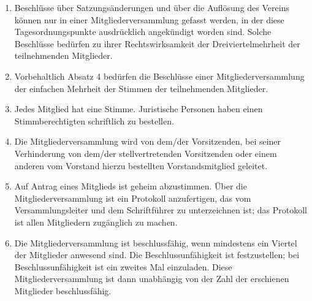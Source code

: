 \documentclass[a4paper]{article}
\begin{document}
\begin{enumerate}
	\item Beschlüsse über Satzungsänderungen und über die Auflösung des Vereins können nur in einer Mitgliederversammlung gefasst werden, in der diese Tagesordnungspunkte ausdrücklich angekündigt worden sind. Solche Beschlüsse bedürfen zu ihrer Rechtswirksamkeit der Dreiviertelmehrheit der teilnehmenden Mitglieder.

	\item Vorbehaltlich Absatz 4 bedürfen die Beschlüsse einer Mitgliederversammlung der einfachen Mehrheit der Stimmen der teilnehmenden Mitglieder.

	\item Jedes Mitglied hat eine Stimme. Juristische Personen haben einen Stimmberechtigten schriftlich zu bestellen.

	\item Die Mitgliederversammlung wird von dem/der Vorsitzenden, bei seiner Verhinderung von dem/der stellvertretenden Vorsitzenden oder einem anderen vom Vorstand hierzu bestellten Vorstandsmitglied geleitet.

	\item Auf Antrag eines Mitglieds ist geheim abzustimmen. Über die Mitgliederversammlung ist ein Protokoll anzufertigen, das vom Versammlungsleiter und dem Schriftführer zu unterzeichnen ist; das Protokoll ist allen Mitgliedern zugänglich zu machen.

	\item Die Mitgliederversammlung ist beschlussfähig, wenn mindestens ein Viertel der Mitglieder anwesend sind. Die Beschlussunfähigkeit ist festzustellen; bei Beschlussunfähigkeit ist ein zweites Mal einzuladen. Diese Mitgliederversammlung ist dann unabhängig von der Zahl der erschienen Mitglieder beschlussfähig.
\end{enumerate}
\end{document}
